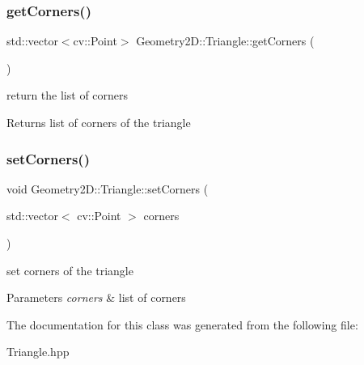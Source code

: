 \subsubsection{\texorpdfstring{get\+Corners()}{getCorners()}}
{\footnotesize\ttfamily std\+::vector$<$cv\+::\+Point$>$ Geometry2\+D\+::\+Triangle\+::get\+Corners (\begin{DoxyParamCaption}{ }\end{DoxyParamCaption})}

return the list of corners \begin{DoxyReturn}{Returns}
list of corners of the triangle 
\end{DoxyReturn}
\mbox{\label{class_geometry2_d_1_1_triangle_af689573b5d1a3b415ee2c236ed5e3abf}} 
\subsubsection{\texorpdfstring{set\+Corners()}{setCorners()}}
{\footnotesize\ttfamily void Geometry2\+D\+::\+Triangle\+::set\+Corners (\begin{DoxyParamCaption}\item[{std\+::vector$<$ cv\+::\+Point $>$}]{corners }\end{DoxyParamCaption})}

set corners of the triangle 
\begin{DoxyParams}{Parameters}
{\em corners} & list of corners \\
\hline
\end{DoxyParams}


The documentation for this class was generated from the following file\+:\begin{DoxyCompactItemize}
\item 
Triangle.\+hpp\end{DoxyCompactItemize}
